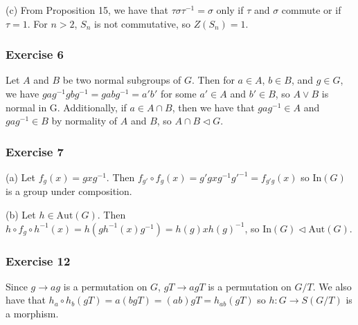 (c) From Proposition 15, we have that $\tau \sigma \tau^{-1} = \sigma$ only if $\tau$ and $\sigma$ commute or
if $\tau = 1$. For $n > 2$, $S_n$ is not commutative, so $Z(S_n) = 1$.

\subsubsection{Exercise 6}
Let $A$ and $B$ be two normal subgroups of $G$. Then for $a \in A$, $b \in B$, and $g \in G$, we have
$g a g^{-1} g b g^{-1} = g a b g^{-1} = a' b'$ for some $a' \in A$ and $b' \in B$, so $A \vee B$ is
normal in G. Additionally, if $a \in A \cap B$, then we have that $g a g^{-1} \in A$ and
$g a g^{-1} \in B$ by normality of $A$ and $B$, so $A \cap B \triangleleft G$.

\subsubsection{Exercise 7}
(a) Let $f_{g}(x) = gxg^{-1}$. Then $f_{g'} \circ f_{g} (x) = g' g x g^{-1} g'^{-1} = f_{g' g} (x)$ so
$\text{In} (G)$ is a group under composition.

(b) Let $h \in \text{Aut}(G)$. Then $h \circ f_g \circ h^{-1} (x) = h(gh^{-1}(x)g^{-1}) = h(g) x h(g)^{-1}$,
so $\text{In} (G) \triangleleft \text{Aut} (G)$.

\subsubsection{Exercise 12}
Since $g \to ag$ is a permutation on $G$, $gT \to agT$ is a permutation on $G / T$. We also have that
$h_a \circ h_b (gT) = a (bg T) = (ab)g T = h_{ab} (gT)$ so $h: G \to S(G / T)$ is a morphism. 
